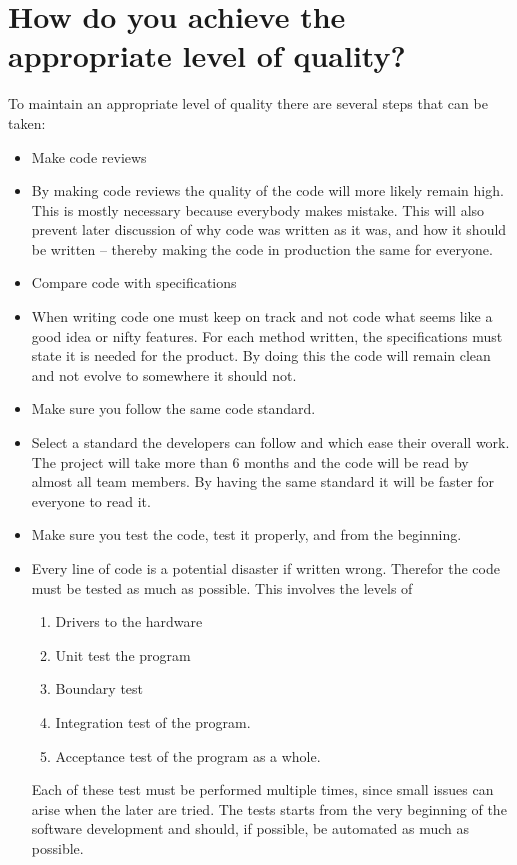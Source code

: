 \documentclass[Main]{subfiles}
\begin{document}
\section{How do you achieve the appropriate level of quality?}

To maintain an appropriate level of quality there are several steps that can be taken:

\begin{itemize}
	\item Make code reviews
	\item[] By making code reviews the quality of the code will more likely remain high.
	This is mostly necessary because everybody makes mistake.
	This will also prevent later discussion of why code was written as it was, and how it should be written -- thereby making the code in production the same for everyone.

	\item Compare code with specifications
	\item[] When writing code one must keep on track and not code what seems like a good idea or nifty features.
	For each method written, the specifications must state it is needed for the product.
	By doing this the code will remain clean and not evolve to somewhere it should not.


	\item Make sure you follow the same code standard.
	\item[] Select a standard the developers can follow and which ease their overall work. 
	The project will take more than 6 months and the code will be read by almost all team members.
	By having the same standard it will be faster for everyone to read it.

	\item Make sure you test the code, test it properly, and from the beginning.
	\item[] Every line of code is a potential disaster if written wrong.
	Therefor the code must be tested as much as possible. 
	This involves the levels of
	\begin{enumerate}
		\item Drivers to the hardware
		\item Unit test the program
		\item Boundary test
		\item Integration test of the program.
		\item Acceptance test of the program as a whole.
	\end{enumerate}
	Each of these test must be performed multiple times, since small issues can arise when the later are tried.
	The tests starts from the very beginning of the software development and should, if possible, be automated as much as possible.


\end{itemize}
\end{document}
